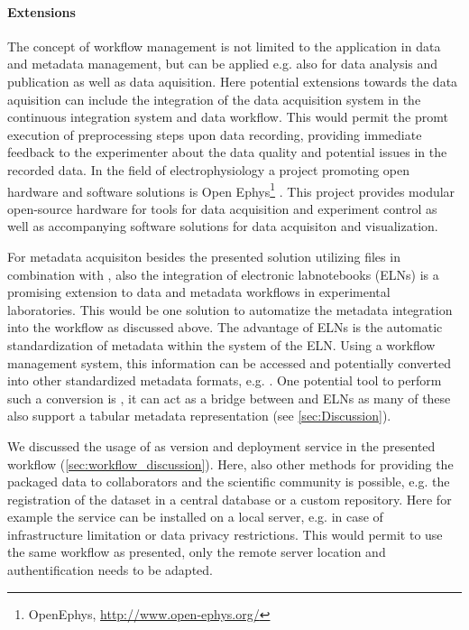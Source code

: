 \paragraph{Extensions}
The concept of workflow management is not limited to the application in data and metadata management, but can be applied e.g. also for data analysis and publication as well as data aquisition.
Here potential extensions towards the data aquisition can include the integration of the data acquisition system in the continuous integration system and data workflow. This would permit the promt execution of preprocessing steps upon data recording, providing immediate feedback to the experimenter about the data quality and potential issues in the recorded data. In the field of electrophysiology a project promoting open hardware and software solutions is Open Ephys\footnote{OpenEphys, \url{http://www.open-ephys.org/}} \citep{Siegle_2017}. This project provides modular open-source hardware for tools for data acquisition and experiment control as well as accompanying software solutions for data acquisiton and visualization.

For metadata acquisiton besides the presented solution utilizing  files in combination with , also the integration of electronic labnotebooks (ELNs) is a promising extension to data and metadata workflows in experimental laboratories. This would be one solution to automatize the metadata integration into the workflow as discussed above. The advantage of ELNs is the automatic standardization of metadata within the system of the ELN. Using a workflow management system, this information can be accessed and potentially converted into other standardized metadata formats, e.g. . One potential tool to perform such a conversion is , it can act as a bridge between  and ELNs as many of these also support a tabular metadata representation (see \cref{sec:Discussion}).

We discussed the usage of  as version and deployment service in the presented workflow (\ref{sec:workflow_discussion}). Here, also other methods for providing the packaged data to collaborators and the scientific community is possible, e.g. the registration of the dataset in a central database or a custom repository. Here for example the  service can be installed on a local server, e.g. in case of infrastructure limitation or data privacy restrictions. This would permit to use the same workflow as presented, only the remote server location and authentification needs to be adapted. 

